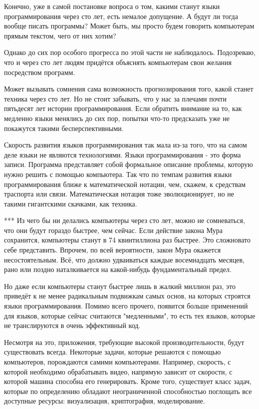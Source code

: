 \documentclass[ebook,12pt,oneside,openany]{memoir}
\begin{document}
Конечно, уже в самой постановке вопроса о том, какими станут языки
программирования через сто лет, есть немалое допущение. А будут ли
тогда вообще писать программы? Может быть, мы просто будем говорить
компьютерам прямым текстом, чего от них хотим?

Однако до сих пор особого прогресса по этой части не наблюдалось.
Подозреваю, что и через сто лет людям придётся объяснять компьютерам
свои желания посредством программ.

Может вызывать сомнения сама возможность прогнозирования того, какой
станет техника через сто лет. Но не стоит забывать, что у нас за
плечами почти пятьдесят лет истории программирования. Если обратить
внимание на то, как медленно языки менялись до сих пор, попытки что-то
предсказать уже не покажутся такими бесперспективными.

Скорость развития языков программирования так мала из-за того, что на
самом деле языки не являются технологиями. Языки программирования -
это форма записи. Программа представляет собой формальное описание
проблемы, которую нужно решить с помощью компьютера. Так что по темпам
развития языки программирования ближе к математической нотации, чем,
скажем, к средствам траспорта или связи. Математическая нотация тоже
эволюционирует, но не такими гигантскими скачками, как техника.

*** Из чего бы ни делались компьютеры через сто лет, можно не
сомневаться, что они будут гораздо быстрее, чем сейчас. Если действие
закона Мура сохранится, компьютеры станут в 74 квинтиллиона раз
быстрее. Это сложновато себе представить. Впрочем, по всей
вероятности, закон Мура окажется несостоятельным. Всё, что должно
удваиваться каждые восемнадцать месяцев, рано или поздно наталкивается
на какой-нибудь фундаментальный предел.

Но даже если компьютеры станут быстрее лишь в жалкий миллион раз, это
приведёт к не менее радикальным подвижкам самых основ, на которых
строятся языки программирования. Помимо всего прочего, появится больше
применений для языков, которые сейчас считаются "медленными", то есть
тех языков, которые не транслируются в очень эффективный код.

Несмотря на это, приложения, требующие высокой производительности,
будут существовать всегда. Некоторые задачи, которые решаются с
помощью компьютеров, порождаются самими компьютерами. Например,
скорость, с которой необходимо обрабатывать видео, напрямую зависит от
скорости, с которой машина способна его генерировать. Кроме того,
существует класс задач, которые по определению обладают неограниченной
способностью поглощать все доступные ресурсы: визуализация,
криптография, моделирование.
\end{document}
